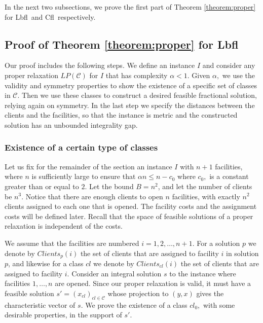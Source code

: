 \documentclass[11pt]{article}
\newcommand{\lbfl}{{\sc Lbfl}}
\newcommand{\cfl}{{\sc Cfl}}
\begin{document}
In the next two subsections, 
we prove the first part of Theorem \ref{theorem:proper} for \lbfl\ and \cfl\ respectively.





\subsection{Proof of Theorem \ref{theorem:proper} for \lbfl\ }
\label{sec:proof_theorem_p1}

Our proof includes the following steps. We define an instance $I$ 
and consider any proper relaxation $LP(\mathcal{C})$ for $I$ that has complexity
$\alpha <1.$ 
Given $\alpha,$ we use   the validity  and symmetry properties to show the existence of
a specific set of classes in $\mathcal{C}$. Then we use these classes to construct a
desired feasible fractional solution, relying again on symmetry. 
In the last step  we specify  the distances between the clients and  the facilities, so
that the instance is metric and the constructed solution has an  unbounded integrality
gap.



\subsubsection{Existence of a certain type of classes}

Let us fix for the remainder of the section 
an instance $I$ with $n+1$ facilities, where $n$ is
sufficiently large to ensure  that $\alpha n \leq n - c_0$  where
$c_0,$  is a
constant greater than or equal to  $2$. Let the bound $B=n^2$, and let
the number of  clients be $n^3$. Notice that  there are enough clients
to open $n$ facilities, with  exactly $n^2$ clients assigned  to each
one that is opened. The  facility costs  and the assignment  costs will  be defined
later.  Recall  that the  space  of  feasible  solutions of  a  proper
relaxation is independent of the costs.

 We  assume that  the  facilities are  numbered
$i=1,2,\ldots ,n+1$. 
For a solution $p$ we  denote by $Clients_p(i)$
the set  of clients  that are assigned  to facility $i$  in solution
$p$, and  likewise for a  class $cl$ we denote  by $Clients_{cl}(i)$
the set of clients that are assigned to facility $i$.  
Consider  an  integral  solution  $s$  to  the  instance  where 
facilities $1,\ldots ,n$  are opened. 
Since our proper  relaxation is valid, it must have   a feasible 
solution $s'=(x_{cl})_{cl \in \mathcal{C}}$  whose projection to $(y,x)$ gives the characteristic
vector of $s$.  We prove the existence of a  class $cl_0,$ with some desirable
properties, in the support of $s'.$ 
\end{document}
